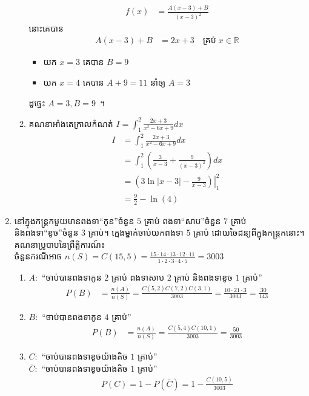 \documentclass[11pt,a4paper]{myclass}
\begin{document}
\begin{enumerate}
\begin{enumerate}
\begin{align*}
			f(x) &=\frac{A(x-3)+B}{(x-3)^2}
			\end{align*}
			នោះគេបាន
			\begin{align*}
			A(x-3)+B &=2x+3\quad\text{គ្រប់}\; x\in\mathbb{R}
			\end{align*}
			\begin{itemize}
				\item យក $ x=3 $ គេបាន $ B=9 $
				\item យក $ x=4 $ គេបាន $ A+9=11 $ នាំឲ្យ $ A=3 $
			\end{itemize}
			ដូច្នេះ $ A=3,B=9 $~។
			\item គណនាអាំងតេក្រាលកំណត់ $ I=\int_{1}^{2}\frac{2x+3}{x^2-6x+9}dx $
			\begin{align*}
			I &=\int_{1}^{2}\frac{2x+3}{x^2-6x+9}dx\\
			&=\int_{1}^{2}\left( \frac{3}{x-3}+\frac{9}{(x-3)^2} \right)dx\\
			&=\left.\left( 3\ln|x-3|-\frac{9}{x-3} \right)\right|_{1}^{2}\\
			&=\frac{9}{2}-\ln (4)
			\end{align*}
		\end{enumerate}
		\item នៅក្នុងកន្ត្រកមួយមានពងទា``កូន''ចំនួន $ 5 $ គ្រាប់ ពងទា``សាប''ចំនួន $ 7 $ គ្រាប់ និងពងទា``ខូច''ចំនួន $ 3 $ គ្រាប់។ ក្មេងម្នាក់ចាប់យកពងទា $ 5 $ គ្រាប់ ដោយចៃដន្យពីក្នុងកន្ត្រកនោះ។
		គណនាប្រូបាបនៃព្រឹត្តិការណ៍៖\\
		ចំនួនករណីអាច $ n(S)=C(15,5)=\frac{15\cdot 14\cdot 13\cdot 12\cdot 11}{1\cdot 2\cdot 3\cdot 4\cdot 5}=3003 $
		\begin{enumerate}
			\item $ A: $ ``ចាប់បានពងទាកូន $ 2 $ គ្រាប់ ពងទាសាប $ 2 $ គ្រាប់ និងពងទាខូច $ 1 $ គ្រាប់''
			\begin{align*}
			P(B) &=\frac{n(A)}{n(S)}
			=\frac{C(5,2)C(7,2)C(3,1)}{3003}
			=\frac{10\cdot 21\cdot 3}{3003}
			=\frac{30}{143}
			\end{align*}
			\item $ B: $ ``ចាប់បានពងទាកូន $ 4 $ គ្រាប់''
			\begin{align*}
			P(B) &=\frac{n(A)}{n(S)}
			=\frac{C(5,4)C(10,1)}{3003}
			=\frac{50}{3003}
			\end{align*}
			\item $ C: $ ``ចាប់បានពងទាខូចយ៉ាងតិច $ 1 $ គ្រាប់''\\
			$ \overline{C}: $ ``ចាប់បានពងទាខូចយ៉ាងតិច $ 1 $ គ្រាប់''
			\begin{align*}
			P(C)=1-P(\overline{C})=1-\frac{C(10,5)}{3003}

\end{align*}
\end{enumerate}
\end{enumerate}
\end{document}
